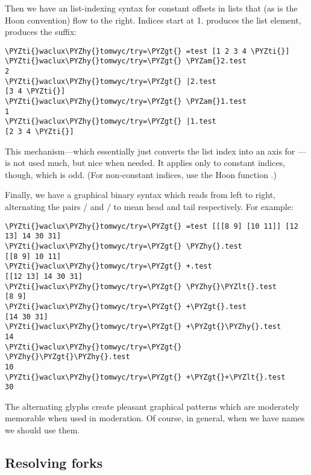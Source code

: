 Then we have an list-indexing syntax for constant offsets in
lists that (as is the Hoon convention) flow to the right.
Indices start at 1.  \kode{\&} produces the list element, \kode{\textbar{}} produces
the suffix:

\begin{framed_shaded}
\begin{Verbatim}[fontsize=\relsize{-2.5},fontseries=b,commandchars=\\\{\}]
\PYZti{}waclux\PYZhy{}tomwyc/try=\PYZgt{} =test [1 2 3 4 \PYZti{}]
\PYZti{}waclux\PYZhy{}tomwyc/try=\PYZgt{} \PYZam{}2.test
2
\PYZti{}waclux\PYZhy{}tomwyc/try=\PYZgt{} |2.test
[3 4 \PYZti{}]
\PYZti{}waclux\PYZhy{}tomwyc/try=\PYZgt{} \PYZam{}1.test
1
\PYZti{}waclux\PYZhy{}tomwyc/try=\PYZgt{} |1.test
[2 3 4 \PYZti{}]
\end{Verbatim}
\end{framed_shaded}
This mechanism---which essentially just converts the list index
into an axis for \kode{+}---is not used much, but nice when needed.
It applies only to constant indices, though, which is odd.  (For
non-constant indices, use the Hoon function .)

Finally, we have a graphical binary syntax which reads from left
to right, alternating the pairs \kode{-}/\kode{+} and \kode{\textless{}}/\kode{\textgreater{}} to mean head
and tail respectively.  For example:

\begin{framed_shaded}
\begin{Verbatim}[fontsize=\relsize{-2.5},fontseries=b,commandchars=\\\{\}]
\PYZti{}waclux\PYZhy{}tomwyc/try=\PYZgt{} =test [[[8 9] [10 11]] [12 13] 14 30 31]
\PYZti{}waclux\PYZhy{}tomwyc/try=\PYZgt{} \PYZhy{}.test
[[8 9] 10 11]
\PYZti{}waclux\PYZhy{}tomwyc/try=\PYZgt{} +.test
[[12 13] 14 30 31]
\PYZti{}waclux\PYZhy{}tomwyc/try=\PYZgt{} \PYZhy{}\PYZlt{}.test
[8 9]
\PYZti{}waclux\PYZhy{}tomwyc/try=\PYZgt{} +\PYZgt{}.test
[14 30 31]
\PYZti{}waclux\PYZhy{}tomwyc/try=\PYZgt{} +\PYZgt{}\PYZhy{}.test
14
\PYZti{}waclux\PYZhy{}tomwyc/try=\PYZgt{} \PYZhy{}\PYZgt{}\PYZhy{}.test
10
\PYZti{}waclux\PYZhy{}tomwyc/try=\PYZgt{} +\PYZgt{}+\PYZlt{}.test
30
\end{Verbatim}
\end{framed_shaded}
The alternating glyphs create pleasant graphical patterns which
are moderately memorable when used in moderation.  Of course, in
general, when we have names we should use them.

\subsection{Resolving forks}

